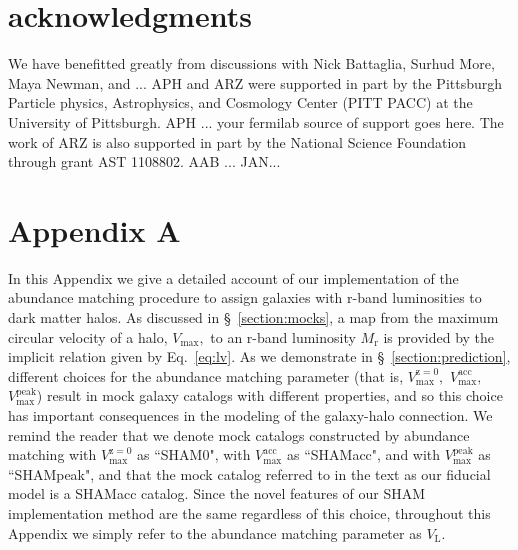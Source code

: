 \documentclass[usenatbib,usegraphicx,letterpaper]{mn2e}
\newcommand{\vpeak}{V_{\mathrm{max}}^{\mathrm{peak}}}
\newcommand{\vmax}{V_{\mathrm{max}}}
\newcommand{\vacc}{V_{\mathrm{max}}^{\mathrm{acc}}}
\newcommand{\vzero}{V_{\mathrm{max}}^{\mathrm{z=0}}}
\newcommand{\vl}{V_{\mathrm{L}}}
\newcommand{\mr}{M_{\mathrm{r}}}
\begin{document}
\section*{acknowledgments}

We have benefitted greatly from discussions with 
Nick Battaglia, Surhud More, Maya Newman, and ...
APH and ARZ were supported in part by the Pittsburgh 
Particle physics, Astrophysics, and Cosmology Center (PITT PACC)
at the University of Pittsburgh. 
APH ... {your fermilab source of support goes here}.
The work of ARZ is also 
supported in part by the National Science Foundation 
through grant AST 1108802.  AAB ... JAN...






\section*{Appendix A}
\label{section:appendix}


In this Appendix we give a detailed account of our implementation of
the abundance matching procedure to assign galaxies with r-band
luminosities to dark matter halos. As discussed in
\S~\ref{section:mocks}, a map from the maximum circular velocity of a
halo, $\vmax,$ to an r-band luminosity $\mr$ is provided by the
implicit relation given by Eq.~\ref{eq:lv}. As we demonstrate in \S~\ref{section:prediction}, different choices for the abundance matching parameter (that is, $\vzero,$ $\vacc,$ $\vpeak$) result in mock galaxy catalogs with different properties, and so this choice has important consequences in the modeling of the galaxy-halo connection. We remind the reader that we denote mock catalogs constructed by abundance matching with $\vzero$ as ``SHAM0", with $\vacc$ as ``SHAMacc", and with $\vpeak$ as ``SHAMpeak", and that the mock catalog referred to in the text as our fiducial model is a SHAMacc catalog. Since the novel features of our SHAM implementation method are the same regardless of this choice, throughout this Appendix we simply refer to the abundance matching parameter as $\vl.$

\end{document}
